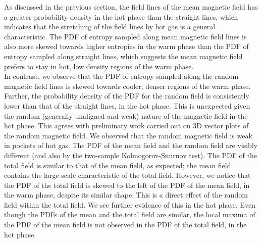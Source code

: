 \documentclass[useAMS,usenatbib]{mn2e}
\begin{document}
As discussed in the previous section, the field lines of the mean magnetic field has a greater probability density in the hot phase than the straight lines, which indicates that the stretching of the field lines by hot gas is a general characteristic. The PDF of entropy sampled along mean magnetic field lines is also more skewed towards higher entropies in the warm phase than the PDF of entropy sampled along straight lines, which suggests the mean magnetic field prefers to stay in hot, low density regions of the warm phase.\\
In contrast, we observe that the PDF of entropy sampled along the random magnetic field lines is skewed towards cooler, denser regions of the warm phase. Further, the probability density of the PDF for the random field is consistently lower than that of the straight lines, in the hot phase. This is unexpected given the random (generally unaligned and weak) nature of the magnetic field in the hot phase. %
This agrees with preliminary work carried out on 3D vector plots of the random magnetic field. We observed that the random magnetic field is weak in pockets of hot gas. The PDF of the mean field and the random field are visibly different (and also by the two-sample Kolmogorov-Smirnov test). The PDF of the total field is similar to that of the mean field, as expected; the mean field contains the large-scale characteristic of the total field. However, we notice that the PDF of the total field is skewed to the left of the PDF of the mean field, in the warm phase, despite its similar shape. This is a direct effect of the random field within the total field. We see further evidence of this in the hot phase. Even though the PDFs of the mean and the total field are similar, the local maxima of the PDF of the mean field is not observed in the PDF of the total field, in the hot phase. 
\end{document}
